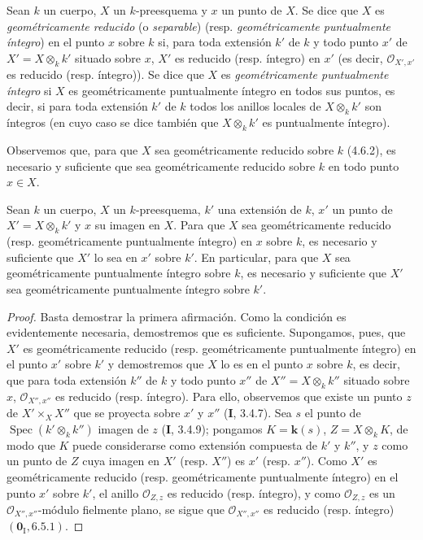\begin{definition}[4.6.9]
\label{IV.2.4.6.9-fr}
Sean $k$ un cuerpo, $X$ un $k$-preesquema y $x$ un punto de $X$. Se dice que
$X$ es \emph{geométricamente reducido} (o \emph{separable}) \textup{(resp.}
\emph{geométricamente puntualmente íntegro}) en el punto $x$ sobre $k$ si,
para toda extensión $k'$ de $k$ y todo punto $x'$ de
$X'=X\otimes_k k'$ situado sobre $x$, $X'$ es reducido \textup{(resp.} íntegro) en
$x'$ \textup{(es decir,} $\mathcal O_{X',x'}$ es reducido \textup{(resp.} íntegro)). Se dice que
$X$ es \emph{geométricamente puntualmente íntegro} si $X$ es geométricamente
puntualmente íntegro en todos sus puntos, es decir, si para toda extensión
$k'$ de $k$ todos los anillos locales de $X\otimes_k k'$ son íntegros \textup{(en
cuyo caso se dice también que $X\otimes_k k'$ es} puntualmente íntegro\textup{)}.
\end{definition}

Observemos que, para que $X$ sea geométricamente reducido sobre $k$ (4.6.2),
es necesario y suficiente que sea geométricamente reducido sobre $k$ en todo
punto $x\in X$.

\begin{proposition}[4.6.10]
\label{IV.2.4.6.10-fr}
Sean $k$ un cuerpo, $X$ un $k$-preesquema, $k'$ una extensión de $k$, $x'$ un
punto de $X'=X\otimes_k k'$ y $x$ su imagen en $X$. Para que $X$ sea
geométricamente reducido \textup{(resp.} geométricamente puntualmente íntegro) en $x$
sobre $k$, es necesario y suficiente que $X'$ lo sea en $x'$ sobre $k'$. En
particular, para que $X$ sea geométricamente puntualmente íntegro sobre $k$,
es necesario y suficiente que $X'$ sea geométricamente puntualmente íntegro
sobre $k'$.
\end{proposition}

\begin{proof}
Basta demostrar la primera afirmación. Como la condición es evidentemente
necesaria, demostremos que es suficiente. Supongamos, pues, que $X'$ es
geométricamente reducido (resp. geométricamente puntualmente íntegro) en el
punto $x'$ sobre $k'$ y demostremos que $X$ lo es en el punto $x$ sobre $k$,
es decir, que para toda extensión $k''$ de $k$ y todo punto $x''$ de
$X''=X\otimes_k k''$ situado sobre $x$, $\mathcal O_{X'',x''}$ es reducido
(resp. íntegro). Para ello, observemos que existe un punto $z$ de
$X'\times_X X''$ que se proyecta sobre $x'$ y $x''$ (\textbf I, 3.4.7). Sea $s$ el
punto de $\operatorname{Spec}(k'\otimes_k k'')$ imagen de $z$ (\textbf I, 3.4.9);
pongamos $K=\boldsymbol{k}(s)$, $Z=X\otimes_k K$, de modo que $K$ puede considerarse como
extensión compuesta de $k'$ y $k''$, y $z$ como un punto de $Z$ cuya imagen
en $X'$ (resp. $X''$) es $x'$ (resp. $x''$). Como $X'$ es geométricamente
reducido (resp. geométricamente puntualmente íntegro) en el punto $x'$ sobre
$k'$, el anillo $\mathcal O_{Z,z}$ es reducido (resp. íntegro), y como
$\mathcal O_{Z,z}$ es un $\mathcal O_{X'',x''}$-módulo fielmente plano, se
sigue que $\mathcal O_{X'',x''}$ es reducido (resp. íntegro)
$(\mathbf{0}_{\mathrm I},6.5.1)$.
\end{proof}

